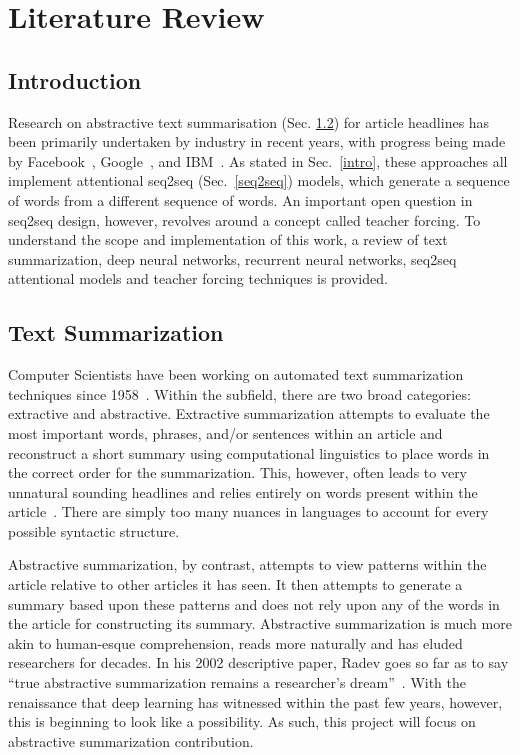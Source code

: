 \section{Literature Review}
\subsection{Introduction}
Research on abstractive text summarisation (Sec. \ref{textsum}) for article headlines has been primarily undertaken by industry in recent years, with progress being made by Facebook~\cite{Rush2015,Chopra2016}, Google~\cite{Liu2016}, and IBM~\cite{Nallapati2016a}. As stated in Sec.~\ref{intro}, these approaches all implement attentional seq2seq (Sec.~\ref{seq2seq}) models, which generate a sequence of words from a different sequence of words. An important open question in seq2seq design, however, revolves around a concept called teacher forcing. To understand the scope and implementation of this work, a review of text summarization, deep neural networks, recurrent neural networks, seq2seq attentional models and teacher forcing techniques is provided.

\subsection{Text Summarization}\label{textsum}
Computer Scientists have been working on automated text summarization techniques since 1958~\cite{Luhn1958}. Within the subfield, there are two broad categories: extractive and abstractive. Extractive summarization attempts to evaluate the most important words, phrases, and/or sentences within an article and reconstruct a short summary using computational linguistics to place words in the correct order for the summarization. This, however, often leads to very unnatural sounding headlines and relies entirely on words present within the article~\cite{Radev2002}. There are simply too many nuances in languages to account for every possible syntactic structure.

Abstractive summarization, by contrast, attempts to view patterns within the article relative to other articles it has seen. It then attempts to generate a summary based upon these patterns and does not rely upon any of the words in the article for constructing its summary.  Abstractive summarization is much more akin to human-esque comprehension, reads more naturally and has eluded researchers for decades. In his 2002 descriptive paper, Radev goes so far as to say ``true abstractive summarization remains a researcher's dream''~\cite{Radev2002}. With the renaissance that deep learning has witnessed within the past few years, however, this is beginning to look like a possibility. As such, this project will focus on abstractive summarization contribution.

